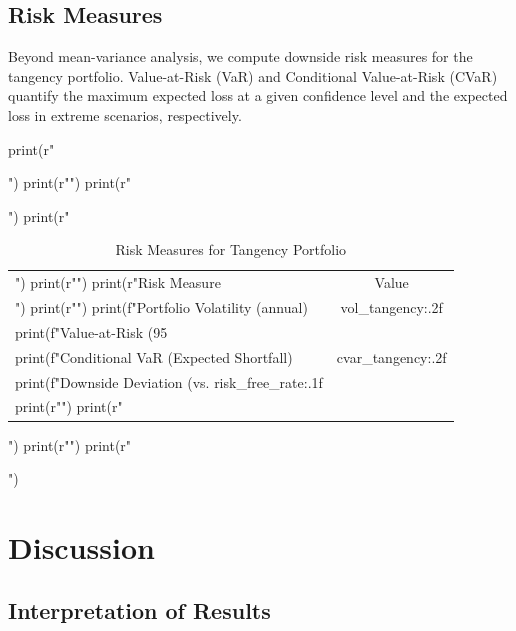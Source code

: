 \documentclass[a4paper, 11pt]{article}
\begin{document}
\subsection{Risk Measures}

Beyond mean-variance analysis, we compute downside risk measures for the tangency portfolio.
Value-at-Risk (VaR) and Conditional Value-at-Risk (CVaR) quantify the maximum expected loss
at a given confidence level and the expected loss in extreme scenarios, respectively.

\begin{pycode}
print(r"\begin{table}[htbp]")
print(r"\centering")
print(r"\caption{Risk Measures for Tangency Portfolio}")
print(r"\begin{tabular}{lc}")
print(r"\toprule")
print(r"Risk Measure & Value \\")
print(r"\midrule")
print(f"Portfolio Volatility (annual) & {vol_tangency:.2f}\\%
print(f"Value-at-Risk (95\\%
print(f"Conditional VaR (Expected Shortfall) & {cvar_tangency:.2f}\\%
print(f"Downside Deviation (vs. {risk_free_rate:.1f}\\%
print(r"\bottomrule")
print(r"\end{tabular}")
print(r"\label{tab:risk}")
print(r"\end{table}")
\end{pycode}

\section{Discussion}

\subsection{Interpretation of Results}
\end{document}
